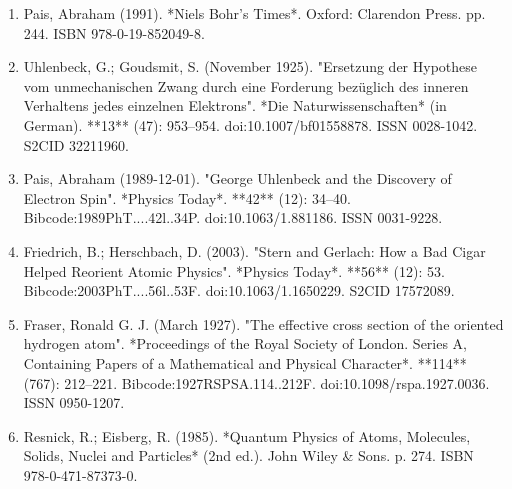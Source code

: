 \begin{enumerate}
\item Pais, Abraham (1991). *Niels Bohr's Times*. Oxford: Clarendon Press. pp. 244. ISBN 978-0-19-852049-8.  
\item Uhlenbeck, G.; Goudsmit, S. (November 1925). "Ersetzung der Hypothese vom unmechanischen Zwang durch eine Forderung bezüglich des inneren Verhaltens jedes einzelnen Elektrons". *Die Naturwissenschaften* (in German). **13** (47): 953–954. doi:10.1007/bf01558878. ISSN 0028-1042. S2CID 32211960.  
\item Pais, Abraham (1989-12-01). "George Uhlenbeck and the Discovery of Electron Spin". *Physics Today*. **42** (12): 34–40. Bibcode:1989PhT....42l..34P. doi:10.1063/1.881186. ISSN 0031-9228.  
\item Friedrich, B.; Herschbach, D. (2003). "Stern and Gerlach: How a Bad Cigar Helped Reorient Atomic Physics". *Physics Today*. **56** (12): 53. Bibcode:2003PhT....56l..53F. doi:10.1063/1.1650229. S2CID 17572089.  
\item Fraser, Ronald G. J. (March 1927). "The effective cross section of the oriented hydrogen atom". *Proceedings of the Royal Society of London. Series A, Containing Papers of a Mathematical and Physical Character*. **114** (767): 212–221. Bibcode:1927RSPSA.114..212F. doi:10.1098/rspa.1927.0036. ISSN 0950-1207.  
\item Resnick, R.; Eisberg, R. (1985). *Quantum Physics of Atoms, Molecules, Solids, Nuclei and Particles* (2nd ed.). John Wiley & Sons. p. 274. ISBN 978-0-471-87373-0.  
\end{enumerate}
